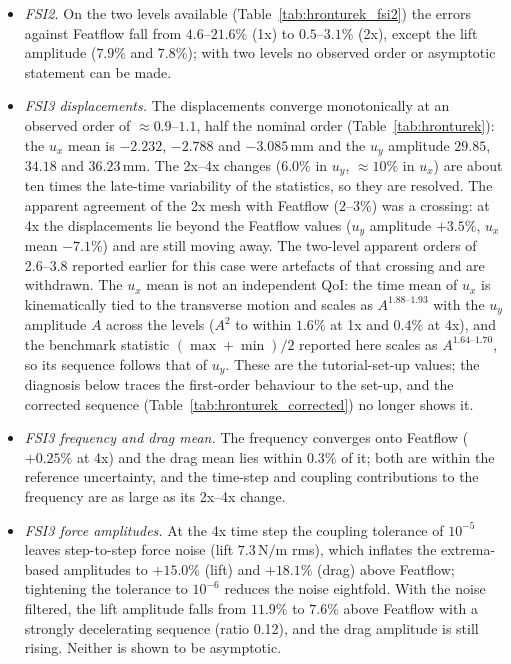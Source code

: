 \begin{itemize}
	\item \emph{FSI2.} On the two levels available (Table~\ref{tab:hronturek_fsi2}) the errors against Featflow fall from $4.6$--$21.6\%$ (1x) to $0.5$--$3.1\%$ (2x), except the lift amplitude ($7.9\%$ and $7.8\%$); with two levels no observed order or asymptotic statement can be made.
	\item \emph{FSI3 displacements.} The displacements converge monotonically at an observed order of $\approx0.9$--$1.1$, half the nominal order (Table~\ref{tab:hronturek}): the $u_x$ mean is $-2.232$, $-2.788$ and $-3.085\,\mathrm{mm}$ and the $u_y$ amplitude $29.85$, $34.18$ and $36.23\,\mathrm{mm}$. The 2x--4x changes ($6.0\%$ in $u_y$, $\approx10\%$ in $u_x$) are about ten times the late-time variability of the statistics, so they are resolved. The apparent agreement of the 2x mesh with Featflow ($2$--$3\%$) was a crossing: at 4x the displacements lie beyond the Featflow values ($u_y$ amplitude $+3.5\%$, $u_x$ mean $-7.1\%$) and are still moving away. The two-level apparent orders of 2.6--3.8 reported earlier for this case were artefacts of that crossing and are withdrawn. The $u_x$ mean is not an independent QoI: the time mean of $u_x$ is kinematically tied to the transverse motion and scales as $A^{1.88\text{--}1.93}$ with the $u_y$ amplitude $A$ across the levels ($A^2$ to within $1.6\%$ at 1x and $0.4\%$ at 4x), and the benchmark statistic $(\max+\min)/2$ reported here scales as $A^{1.64\text{--}1.70}$, so its sequence follows that of $u_y$. These are the tutorial-set-up values; the diagnosis below traces the first-order behaviour to the set-up, and the corrected sequence (Table~\ref{tab:hronturek_corrected}) no longer shows it.
	\item \emph{FSI3 frequency and drag mean.} The frequency converges onto Featflow ($+0.25\%$ at 4x) and the drag mean lies within $0.3\%$ of it; both are within the reference uncertainty, and the time-step and coupling contributions to the frequency are as large as its 2x--4x change.
	\item \emph{FSI3 force amplitudes.} At the 4x time step the coupling tolerance of $10^{-5}$ leaves step-to-step force noise (lift $7.3\,\mathrm{N/m}$ rms), which inflates the extrema-based amplitudes to $+15.0\%$ (lift) and $+18.1\%$ (drag) above Featflow; tightening the tolerance to $10^{-6}$ reduces the noise eightfold. With the noise filtered, the lift amplitude falls from $11.9\%$ to $7.6\%$ above Featflow with a strongly decelerating sequence (ratio 0.12), and the drag amplitude is still rising. Neither is shown to be asymptotic.

\end{itemize}
